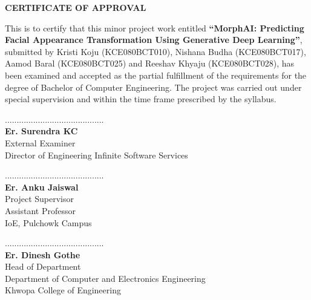 \vspace*{1.3in}
\begin{center}
\large{\textbf{CERTIFICATE OF APPROVAL}}
\end{center}
\vspace{1cm}


\noindent
This is to certify that this minor project work entitled \textbf{``MorphAI: Predicting Facial Appearance Transformation Using Generative Deep Learning''}, submitted by Kristi Koju (KCE080BCT010), Nishana Budha (KCE080BCT017), Aamod Baral (KCE080BCT025) and Reeshav Khyaju (KCE080BCT028), has been examined and accepted as the partial fulfillment of the requirements for the degree of Bachelor of Computer Engineering. The project was carried out under special supervision and within the time frame prescribed by the syllabus.


\vspace{2cm}

\noindent
\begin{minipage}[t]{0.45\textwidth}
\centering
..........................................\\
\textbf{Er. Surendra KC} \\
External Examiner \\
Director of Engineering Infinite Software Services
\end{minipage}
\hfill
\begin{minipage}[t]{0.45\textwidth}
\centering


..........................................\\
\textbf{Er. Anku Jaiswal} \\
Project Supervisor \\
Assistant Professor\\
IoE, Pulchowk Campus \\
\end{minipage}

\vspace{1.5cm}

\vspace{0.5cm}
\begin{center}
..........................................\\
\textbf{Er. Dinesh Gothe}\\
Head of Department\\
Department of Computer and Electronics Engineering\\
Khwopa College of Engineering
\end{center}
\newpage

